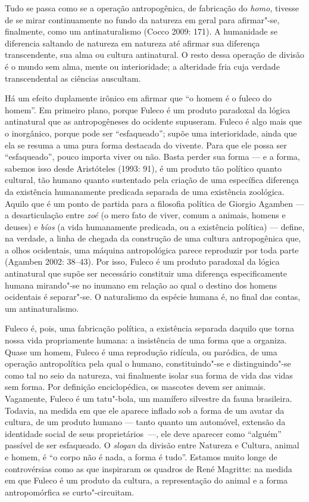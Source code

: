 Tudo se passa como se a operação antropogênica, de fabricação do
\emph{homo, }tivesse de se mirar continuamente no fundo da natureza em
geral para afirmar"-se, finalmente, como um antinaturalismo (Cocco 2009:
171). A humanidade se diferencia saltando de natureza em natureza até
afirmar sua diferença transcendente, sua alma ou cultura antinatural. O
resto dessa operação de divisão é o mundo sem alma, mente ou
interioridade; a alteridade fria cuja verdade transcendental as ciências
auscultam.

Há um efeito duplamente irônico em afirmar que ``o homem é o fuleco do
homem''. Em primeiro plano, porque Fuleco é um produto paradoxal da
lógica antinatural que as antropogêneses do ocidente supuseram. Fuleco é
algo mais que o inorgânico, porque pode ser ``esfaqueado''; supõe uma
interioridade, ainda que ela se resuma a uma pura forma destacada do
vivente. Para que ele possa ser ``esfaqueado'', pouco importa viver ou
não. Basta perder sua forma --- e a forma, sabemos isso desde Aristóteles
(1993: 91), é um produto tão político quanto cultural, tão humano
quanto sustentado pela criação de uma específica diferença da existência
humanamente predicada separada de uma existência zoológica. Aquilo que é
um ponto de partida para a filosofia política de Giorgio Agamben --- a
desarticulação entre \emph{zoé }(o mero fato de viver, comum a animais,
homens e deuses) e \emph{bíos} (a vida humanamente predicada, ou a
existência política) --- define, na verdade, a linha de chegada da
construção de uma cultura antropogênica que, a olhos ocidentais, uma
máquina antropológica parece reproduzir por toda parte (Agamben 2002:
38--43). Por isso, Fuleco é um produto paradoxal da lógica antinatural
que supõe ser necessário constituir uma diferença especificamente humana
mirando"-se no inumano em relação ao qual o destino dos homens ocidentais
é separar"-se. O naturalismo da espécie humana é, no final das contas, um
antinaturalismo.

Fuleco é, pois, uma fabricação política, a existência separada daquilo
que torna nossa vida propriamente humana: a insistência de uma forma que
a organiza. Quase um homem, Fuleco é uma reprodução ridícula, ou
paródica, de uma operação antropolítica pela qual o humano,
constituindo"-se e distinguindo"-se como tal no seio da natureza, vai
finalmente isolar sua forma de vida das vidas sem forma. Por definição
enciclopédica, os mascotes devem ser animais. Vagamente, Fuleco é um
tatu"-bola, um mamífero silvestre da fauna brasileira. Todavia, na medida
em que ele aparece inflado sob a forma de um avatar da cultura, de um
produto humano --- tanto quanto um automóvel, extensão da identidade
social de seus proprietários~---, ele deve aparecer como ``alguém''
passível de ser esfaqueado. O \emph{slogan} da divisão entre Natureza e
Cultura, animal e homem, é ``o corpo não é nada, a forma é tudo''.
Estamos muito longe de controvérsias como as que inspiraram os quadros
de René Magritte: na medida em que Fuleco é um produto da
cultura, a representação do animal e a forma antropomórfica se
curto"-circuitam.

